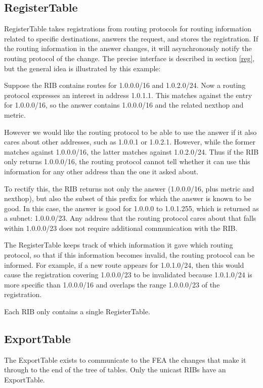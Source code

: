 \documentclass[11pt]{article}
\begin{document}
\subsection{RegisterTable}

RegisterTable takes registrations from routing protocols for routing
information related to specific destinations, answers the request, and
stores the registration.  If the routing information in the
answer changes, it will asynchronously notify the routing protocol of
the change.  The precise interface is described in section \ref{reg},
but the general idea is illustrated by this example:

Suppose the RIB contains routes for 1.0.0.0/16 and 1.0.2.0/24.  Now a
routing protocol expresses an interest in address 1.0.1.1.  This
matches against the entry for 1.0.0.0/16, so the answer contains
1.0.0.0/16 and the related nexthop and metric.

However we would like the routing protocol to be able to use the
answer if it also cares about other addresses, such as 1.0.0.1 or
1.0.2.1.  However, while the former matches against 1.0.0.0/16, the
latter matches against 1.0.2.0/24.  Thus if the RIB only returns
1.0.0.0/16, the routing protocol cannot tell whether it can use this
information for any other address than the one it asked about.

To rectify this, the RIB returns not only the answer (1.0.0.0/16, plus
metric and nexthop), but also the subset of this prefix for which the
answer is known to be good.  In this case, the answer is good for
1.0.0.0 to 1.0.1.255, which is returned as a subnet: 1.0.0.0/23.
Any address that the routing protocol cares about that falls within
1.0.0.0/23 does not require additional communication with the RIB.

The RegisterTable keeps track of which information it gave which
routing protocol, so that if this information becomes invalid, the
routing protocol can be informed.  For example, if a new route appears
for 1.0.1.0/24, then this would cause the registration covering
1.0.0.0/23 to be invalidated because 1.0.1.0/24 is more specific than
1.0.0.0/16 and overlaps the range 1.0.0.0/23 of the registration.

Each RIB only contains a single RegisterTable.

\subsection{ExportTable}

The ExportTable exists to communicate to the FEA the changes
that make it through to the end of the tree of tables.  Only the
unicast RIBs have an ExportTable.
\end{document}
